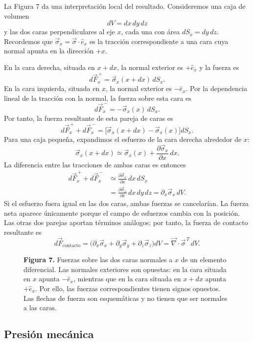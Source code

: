 La Figura 7 da una interpretación local del resultado. Consideremos una caja de volumen
\[
dV=dx\,dy\,dz
\]
y las dos caras perpendiculares al eje $x$, cada una con área $dS_x=dy\,dz$. Recordemos que $\vec\sigma_x=\vec\sigma\cdot\hat e_x$ es la tracción correspondiente a una cara cuya normal apunta en la dirección $+x$.

En la cara derecha, situada en $x+dx$, la normal exterior es $+\hat e_x$ y la fuerza es
\[
d\vec F_x^{\,+}=\vec\sigma_x(x+dx)\,dS_x.
\]
En la cara izquierda, situada en $x$, la normal exterior es $-\hat e_x$. Por la dependencia lineal de la tracción con la normal, la fuerza sobre esta cara es
\[
d\vec F_x^{\,-}=-\vec\sigma_x(x)\,dS_x.
\]
Por tanto, la fuerza resultante de esta pareja de caras es
\[
d\vec F_x^{\,+}+d\vec F_x^{\,-}
=\bigl[\vec\sigma_x(x+dx)-\vec\sigma_x(x)\bigr]dS_x.
\]
Para una caja pequeña, expandimos el esfuerzo de la cara derecha alrededor de $x$:
\[
\vec\sigma_x(x+dx)
\simeq\vec\sigma_x(x)
+\frac{\partial\vec\sigma_x}{\partial x}\,dx.
\]
La diferencia entre las tracciones de ambas caras es entonces
\[
\begin{aligned}
d\vec F_x^{\,+}+d\vec F_x^{\,-}
&\simeq\frac{\partial\vec\sigma_x}{\partial x}
\,dx\,dS_x\\
&=\frac{\partial\vec\sigma_x}{\partial x}
\,dx\,dy\,dz
=\partial_x\vec\sigma_x\,dV.
\end{aligned}
\]
Si el esfuerzo fuera igual en las dos caras, ambas fuerzas se cancelarían. La fuerza neta aparece únicamente porque el campo de esfuerzos cambia con la posición.
Las otras dos parejas aportan términos análogos; por tanto, la fuerza de contacto resultante es
\[
d\vec F_{\mathrm{contacto}}
=\bigl(\partial_x\vec\sigma_x+\partial_y\vec\sigma_y+\partial_z\vec\sigma_z\bigr)dV
=\vec\nabla\cdot\vec\sigma^{\,T}\,dV.
\]

\begin{figure}[H]
\centering

\par\medskip
\textbf{Figura 7.} Fuerzas sobre las dos caras normales a $x$ de un elemento diferencial. Las normales exteriores son opuestas: en la cara situada en $x$ apunta $-\hat e_x$, mientras que en la cara situada en $x+dx$ apunta $+\hat e_x$. Por ello, las fuerzas correspondientes tienen signos opuestos. Las flechas de fuerza son esquemáticas y no tienen que ser normales a las caras.
\end{figure}

\subsection{Presión mecánica}

